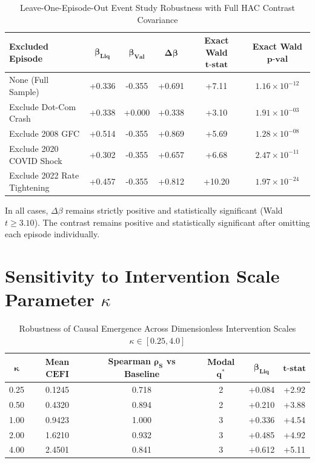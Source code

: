 \documentclass[12pt]{article}
\begin{document}
\begin{table}[htbp]
\centering
\caption{Leave-One-Episode-Out Event Study Robustness with Full HAC Contrast Covariance}
\label{tab:app_leave_one_out}
\begin{tabular}{lccccc}
\toprule
\textbf{Excluded Episode} & $\mathbf{\beta_{\text{Liq}}}$ & $\mathbf{\beta_{\text{Val}}}$ & $\mathbf{\Delta \beta}$ & \textbf{Exact Wald } $\mathbf{t\text{-stat}}$ & \textbf{Exact Wald } $\mathbf{p\text{-val}}$ \\
\midrule
None (Full Sample)        & +0.336 & -0.355 & +0.691 & +7.11 & $1.16 \times 10^{-12}$ \\
Exclude Dot-Com Crash     & +0.338 & +0.000 & +0.338 & +3.10 & $1.91 \times 10^{-03}$ \\
Exclude 2008 GFC          & +0.514 & -0.355 & +0.869 & +5.69 & $1.28 \times 10^{-08}$ \\
Exclude 2020 COVID Shock  & +0.302 & -0.355 & +0.657 & +6.68 & $2.47 \times 10^{-11}$ \\
Exclude 2022 Rate Tightening & +0.457 & -0.355 & +0.812 & +10.20 & $1.97 \times 10^{-24}$ \\
\bottomrule
\end{tabular}
\end{table}

In all cases, $\Delta \beta$ remains strictly positive and statistically significant (Wald $t \ge 3.10$). The contrast remains positive and statistically significant after omitting each episode individually.

\section{Sensitivity to Intervention Scale Parameter \texorpdfstring{$\kappa$}{kappa}}
\label{app:kappa_sensitivity}

\begin{table}[htbp]
\centering
\caption{Robustness of Causal Emergence Across Dimensionless Intervention Scales $\kappa \in [0.25, 4.0]$}
\label{tab:app_kappa}
\begin{tabular}{cccccc}
\toprule
$\mathbf{\kappa}$ & \textbf{Mean } $\mathbf{CEFI}$ & \textbf{Spearman } $\mathbf{\rho_S}$ vs Baseline & \textbf{Modal } $\mathbf{q^*}$ & $\mathbf{\beta_{\text{Liq}}}$ & $\mathbf{t\text{-stat}}$ \\
\midrule
0.25 & 0.1245 & 0.718 & 2 & +0.084 & +2.92 \\
0.50 & 0.4320 & 0.894 & 2 & +0.210 & +3.88 \\
1.00 & 0.9423 & 1.000 & 3 & +0.336 & +4.54 \\
2.00 & 1.6210 & 0.932 & 3 & +0.485 & +4.92 \\
4.00 & 2.4501 & 0.841 & 3 & +0.612 & +5.11 \\
\bottomrule
\end{tabular}
\end{table}
\end{document}
